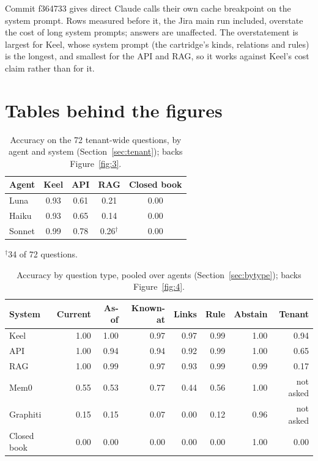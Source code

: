 \documentclass{article}
\begin{document}
Commit f364733 gives direct Claude calls their own cache breakpoint on the system prompt. Rows measured before it, the Jira main run included, overstate the cost of long system prompts; answers are unaffected. The overstatement is largest for Keel, whose system prompt (the cartridge's kinds, relations and rules) is the longest, and smallest for the API and RAG, so it works against Keel's cost claim rather than for it.

\section{Tables behind the figures}
\label{app:tables}
\setcounter{table}{0}

\begin{table}[htbp]
\caption{Accuracy on the 72 tenant-wide questions, by agent and system (Section~\ref{sec:tenant}); backs Figure~\ref{fig:3}.}
\label{tab:b1}
\centering
\small
\begin{tabular}{l c c c c}
\toprule
Agent & Keel & API & RAG & Closed book \\
\midrule
Luna & 0.93 & 0.61 & 0.21 & 0.00 \\
Haiku & 0.93 & 0.65 & 0.14 & 0.00 \\
Sonnet & 0.99 & 0.78 & 0.26$^\dagger$ & 0.00 \\
\bottomrule
\end{tabular}

\smallskip
{\footnotesize $^\dagger$34 of 72 questions.}
\end{table}

\begin{table}[htbp]
\caption{Accuracy by question type, pooled over agents (Section~\ref{sec:bytype}); backs Figure~\ref{fig:4}.}
\label{tab:b2}
\centering
\small
\begin{tabular}{l r r r r r r r}
\toprule
System & Current & As-of & Known-at & Links & Rule & Abstain & Tenant \\
\midrule
Keel & 1.00 & 1.00 & 0.97 & 0.97 & 0.99 & 1.00 & 0.94 \\
API & 1.00 & 0.94 & 0.94 & 0.92 & 0.99 & 1.00 & 0.65 \\
RAG & 1.00 & 0.99 & 0.97 & 0.93 & 0.99 & 0.99 & 0.17 \\
Mem0 & 0.55 & 0.53 & 0.77 & 0.44 & 0.56 & 1.00 & not asked \\
Graphiti & 0.15 & 0.15 & 0.07 & 0.00 & 0.12 & 0.96 & not asked \\
Closed book & 0.00 & 0.00 & 0.00 & 0.00 & 0.00 & 1.00 & 0.00 \\
\bottomrule
\end{tabular}
\end{table}
\end{document}
